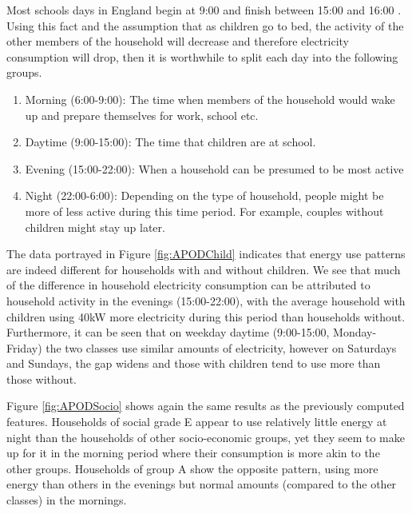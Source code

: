 Most schools days in England begin at 9:00 and finish between 15:00 and 16:00 \cite{school_times}. Using this fact and the assumption that as children go to bed, the activity of the other members of the household will decrease and therefore electricity consumption will drop, then it is worthwhile to split each day into the following groups.
\begin{enumerate}
\item Morning (6:00-9:00): The time when members of the household would wake up and prepare themselves for work, school etc.
\item Daytime (9:00-15:00): The time that children are at school.
\item Evening (15:00-22:00):  When a household can be presumed to be most active
\item Night (22:00-6:00): Depending on the type of household, people might be more of less active during this time period. For example, couples without children might stay up later.
\end{enumerate}
\APODChild %


The data portrayed in Figure \ref{fig:APODChild} indicates that energy use patterns are indeed different for households with and without children. We see that much of the difference in household electricity consumption can be attributed to household activity in the evenings (15:00-22:00), with the average household with children using 40kW more electricity during this period than households without. Furthermore, it can be seen that on weekday daytime (9:00-15:00, Monday-Friday) the two classes use similar amounts of electricity, however on Saturdays and Sundays, the gap widens and those with children tend to use more than those without. 

\APODSocio %

Figure \ref{fig:APODSocio} shows again the same results as the previously computed features. Households of social grade E appear to use relatively little energy at night than the households of other socio-economic groups, yet they seem to make up for it in the morning period where their consumption is more akin to the other groups. Households of group A show the opposite pattern, using more energy than others in the evenings but normal amounts (compared to the other classes) in the mornings.


